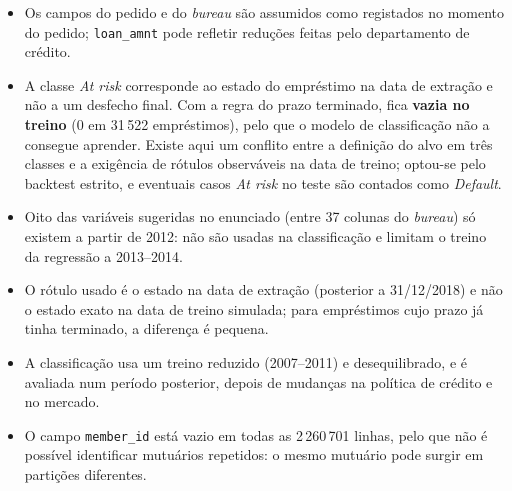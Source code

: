\begin{itemize}
  \item Os campos do pedido e do \textit{bureau} são assumidos como registados no momento do pedido; \texttt{loan\_amnt} pode refletir reduções feitas pelo departamento de crédito.
  \item A classe \textit{At risk} corresponde ao estado do empréstimo na data de extração e não a um desfecho final. Com a regra do prazo terminado, fica \textbf{vazia no treino} (0 em 31\,522 empréstimos), pelo que o modelo de classificação não a consegue aprender. Existe aqui um conflito entre a definição do alvo em três classes e a exigência de rótulos observáveis na data de treino; optou-se pelo backtest estrito, e eventuais casos \textit{At risk} no teste são contados como \textit{Default}.
  \item Oito das variáveis sugeridas no enunciado (entre 37 colunas do \textit{bureau}) só existem a partir de 2012: não são usadas na classificação e limitam o treino da regressão a 2013--2014.
  \item O rótulo usado é o estado na data de extração (posterior a 31/12/2018) e não o estado exato na data de treino simulada; para empréstimos cujo prazo já tinha terminado, a diferença é pequena.
  \item A classificação usa um treino reduzido (2007--2011) e desequilibrado, e é avaliada num período posterior, depois de mudanças na política de crédito e no mercado.
  \item O campo \texttt{member\_id} está vazio em todas as 2\,260\,701 linhas, pelo que não é possível identificar mutuários repetidos: o mesmo mutuário pode surgir em partições diferentes.
\end{itemize}